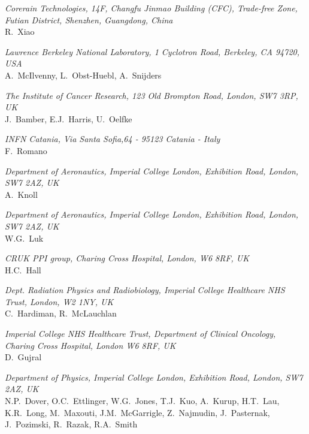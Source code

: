 \vspace{0.5cm}
\noindent \textit{Corerain Technologies, 14F, Changfu Jinmao Building (CFC), Trade-free Zone, Futian District, Shenzhen, Guangdong, China} \\
R.~Xiao
 
\vspace{0.5cm}
\noindent \textit{Lawrence Berkeley National Laboratory, 1 Cyclotron Road, Berkeley, CA 94720, USA} \\
A.~McIlvenny, L.~Obst-Huebl, A.~Snijders
 
\vspace{0.5cm}
\noindent \textit{The Institute of Cancer Research, 123 Old Brompton Road, London, SW7 3RP, UK} \\
J.~Bamber, E.J.~Harris, U.~Oelfke
 
\vspace{0.5cm}
\noindent \textit{INFN Catania, Via Santa Sofia,64 - 95123 Catania - Italy} \\
F.~Romano
 
\vspace{0.5cm}
\noindent \textit{Department of Aeronautics, Imperial College London, Exhibition Road, London, SW7 2AZ, UK} \\
A.~Knoll
 
\vspace{0.5cm}
\noindent \textit{Department of Aeronautics, Imperial College London, Exhibition Road, London, SW7 2AZ, UK} \\
W.G.~Luk
 
\vspace{0.5cm}
\noindent \textit{CRUK PPI group, Charing Cross Hospital, London, W6 8RF, UK} \\
H.C.~Hall
 
\vspace{0.5cm}
\noindent \textit{Dept. Radiation Physics and Radiobiology, Imperial College Healthcare NHS Trust, London, W2 1NY, UK} \\
C.~Hardiman, R.~McLauchlan
 
\vspace{0.5cm}
\noindent \textit{Imperial College NHS Healthcare Trust, Department of Clinical Oncology, Charing Cross Hospital, London W6 8RF, UK} \\
D.~Gujral
 
\vspace{0.5cm}
\noindent \textit{Department of Physics, Imperial College London, Exhibition Road, London, SW7 2AZ, UK} \\
N.P.~Dover, O.C.~Ettlinger, W.G.~Jones, T.J.~Kuo, A.~Kurup, H.T.~Lau, K.R.~Long, M.~Maxouti, J.M.~McGarrigle, Z.~Najmudin, J.~Pasternak, J.~Pozimski, R.~Razak, R.A.~Smith
 
